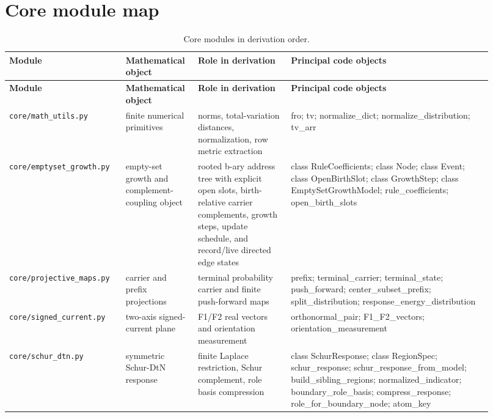 \documentclass[11pt]{article}
\theoremstyle{remark}
\newcommand{\code}[1]{\texttt{#1}}
\numberwithin{equation}{section}
\begin{document}
\newpage
\section{Core module map}
\begin{longtable}{>{\raggedright\arraybackslash}p{0.22\linewidth}>{\raggedright\arraybackslash}p{0.13\linewidth}>{\raggedright\arraybackslash}p{0.18\linewidth}>{\raggedright\arraybackslash}p{0.39\linewidth}}
\caption{Core modules in derivation order.}\label{tab:core-map}\\
\toprule
\textbf{Module} & \textbf{Mathematical object} & \textbf{Role in derivation} & \textbf{Principal code objects}\\
\midrule
\endfirsthead
\toprule
\textbf{Module} & \textbf{Mathematical object} & \textbf{Role in derivation} & \textbf{Principal code objects}\\
\midrule
\endhead
\code{core/math\_\allowbreak{}utils.py} & finite numerical primitives & norms, total-variation distances, normalization, row metric extraction & fro; tv; normalize\_\allowbreak{}dict; normalize\_\allowbreak{}distribution; tv\_\allowbreak{}arr\\
\hline
\code{core/emptyset\_\allowbreak{}growth.py} & empty-set growth and complement-coupling object & rooted b-ary address tree with explicit open slots, birth-relative carrier complements, growth steps, update schedule, and record/live directed edge states & class RuleCoefficients; class Node; class Event; class OpenBirthSlot; class GrowthStep; class EmptySetGrowthModel; rule\_\allowbreak{}coefficients; open\_\allowbreak{}birth\_\allowbreak{}slots\\
\hline
\code{core/projective\_\allowbreak{}maps.py} & carrier and prefix projections & terminal probability carrier and finite push-forward maps & prefix; terminal\_\allowbreak{}carrier; terminal\_\allowbreak{}state; push\_\allowbreak{}forward; center\_\allowbreak{}subset\_\allowbreak{}prefix; split\_\allowbreak{}distribution; response\_\allowbreak{}energy\_\allowbreak{}distribution\\
\hline
\code{core/signed\_\allowbreak{}current.py} & two-axis signed-current plane & F1/F2 real vectors and orientation measurement & orthonormal\_\allowbreak{}pair; F1\_\allowbreak{}F2\_\allowbreak{}vectors; orientation\_\allowbreak{}measurement\\
\hline
\code{core/schur\_\allowbreak{}dtn.py} & symmetric Schur-DtN response & finite Laplace restriction, Schur complement, role basis compression & class SchurResponse; class RegionSpec; schur\_\allowbreak{}response; schur\_\allowbreak{}response\_\allowbreak{}from\_\allowbreak{}model; build\_\allowbreak{}sibling\_\allowbreak{}regions; normalized\_\allowbreak{}indicator; boundary\_\allowbreak{}role\_\allowbreak{}basis; compress\_\allowbreak{}response; role\_\allowbreak{}for\_\allowbreak{}boundary\_\allowbreak{}node; atom\_\allowbreak{}key\\

\end{longtable}
\end{document}
